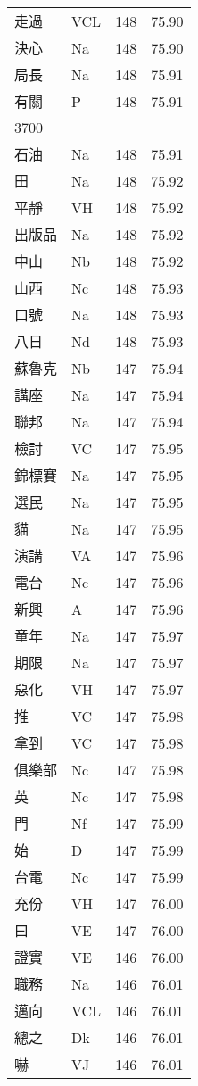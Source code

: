 \documentclass[twocolumn]{book}
\begin{document}
\begin{supertabular}{llrr}
走過 & VCL & 148 &  75.90\\
決心 & Na & 148 &  75.90\\
局長 & Na & 148 &  75.91\\
有關 & P & 148 &  75.91\\
3700\\
石油 & Na & 148 &  75.91\\
田 & Na & 148 &  75.92\\
平靜 & VH & 148 &  75.92\\
出版品 & Na & 148 &  75.92\\
中山 & Nb & 148 &  75.92\\
山西 & Nc & 148 &  75.93\\
口號 & Na & 148 &  75.93\\
八日 & Nd & 148 &  75.93\\
蘇魯克 & Nb & 147 &  75.94\\
講座 & Na & 147 &  75.94\\
聯邦 & Na & 147 &  75.94\\
檢討 & VC & 147 &  75.95\\
錦標賽 & Na & 147 &  75.95\\
選民 & Na & 147 &  75.95\\
貓 & Na & 147 &  75.95\\
演講 & VA & 147 &  75.96\\
電台 & Nc & 147 &  75.96\\
新興 & A & 147 &  75.96\\
童年 & Na & 147 &  75.97\\
期限 & Na & 147 &  75.97\\
惡化 & VH & 147 &  75.97\\
推 & VC & 147 &  75.98\\
拿到 & VC & 147 &  75.98\\
俱樂部 & Nc & 147 &  75.98\\
英 & Nc & 147 &  75.98\\
門 & Nf & 147 &  75.99\\
始 & D & 147 &  75.99\\
台電 & Nc & 147 &  75.99\\
充份 & VH & 147 &  76.00\\
曰 & VE & 147 &  76.00\\
證實 & VE & 146 &  76.00\\
職務 & Na & 146 &  76.01\\
邁向 & VCL & 146 &  76.01\\
總之 & Dk & 146 &  76.01\\
嚇 & VJ & 146 &  76.01\\

\end{supertabular}
\end{document}
